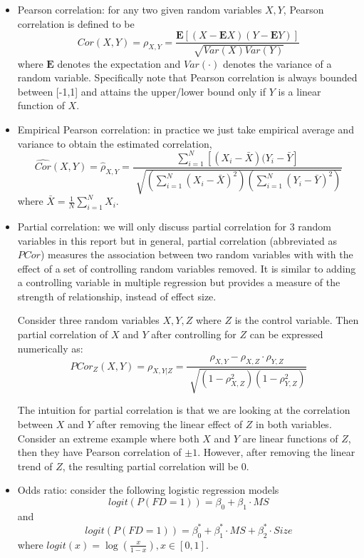 \documentclass[10pt,letterpaper]{article}
\begin{document}
\begin{itemize}
\item
Pearson correlation: for any two given random variables $X,Y$, Pearson correlation is defined to be 
\begin{equation}
    Cor(X,Y) = \rho_{X,Y} = \frac{\mathbf{E}[(X-\mathbf{E}X)(Y-\mathbf{E}Y)]}{\sqrt[]{Var(X)Var(Y)}}
\end{equation}
 where $\mathbf{E}$ denotes the expectation and $Var(\cdot)$ denotes the variance of a random variable. Specifically note that Pearson correlation is always bounded between [-1,1] and attains the upper/lower bound only if $Y$ is a linear function of $X$. 
\item
Empirical Pearson correlation: in practice we just take empirical average and variance to obtain the estimated correlation,
\begin{equation}
    \hat{Cor}(X,Y) = \hat{\rho}_{X,Y} = \frac{\sum_{i=1}^N[(X_i-\bar{X})(Y_i-\bar{Y}]}{\sqrt[]{(\sum_{i=1}^N(X_i-\bar{X})^2)(\sum_{i=1}^N(Y_i-\bar{Y})^2)}}
\end{equation} where $\bar{X} = \frac{1}{N}\sum_{i=1}^N X_i$.

\item
Partial correlation: we will only discuss partial correlation for 3 random variables in this report but in general, partial correlation (abbreviated as $PCor$) measures the association between two random variables with with the effect of a set of controlling random variables removed. It is similar to adding a controlling variable in multiple regression but provides a measure of the strength of relationship, instead of effect size. 

Consider three random variables $X,Y,Z$ where $Z$ is the control variable. Then partial correlation of $X$ and $Y$ after controlling for $Z$ can be expressed numerically as:
\begin{equation}
PCor_Z(X,Y) =\rho_{X,Y|Z}= \frac{\rho_{X,Y}-\rho_{X,Z}\cdot \rho_{Y,Z}}{\sqrt[]{(1-\rho_{X,Z}^2)(1-\rho_{Y,Z}^2)}}
\end{equation}

The intuition for partial correlation is that we are looking at the correlation between $X$ and $Y$ after removing the linear effect of $Z$ in both variables. Consider an extreme example where  both $X$ and $Y$ are linear functions of $Z$, then they have Pearson correlation of $\pm 1$. However, after removing the linear trend of $Z$, the resulting partial correlation will be 0.



\item
Odds ratio: consider the following logistic regression models
\begin{equation}
    logit(P(FD=1)) = \beta_0 + \beta_1 \cdot MS
\end{equation} and 
\begin{equation}
    logit(P(FD=1)) = \beta^*_0 + \beta^*_1 \cdot MS + \beta^*_2 \cdot Size
\end{equation}
where $logit(x) = \log(\frac{x}{1-x}),x\in [0,1]$.


\end{itemize}
\end{document}
